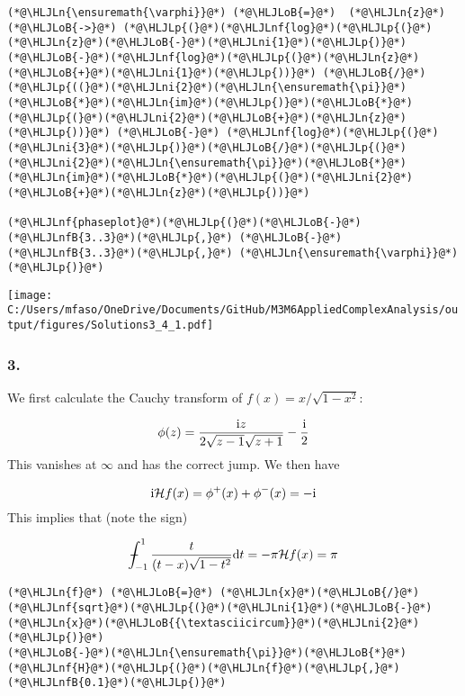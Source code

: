 \documentclass[12pt,landscape]{article}
\newcommand{\HLJLn}[1]{#1}
\newcommand{\HLJLnf}[1]{\textcolor[RGB]{66,102,213}{#1}}
\newcommand{\HLJLnfB}[1]{\textcolor[RGB]{59,151,46}{#1}}
\newcommand{\HLJLni}[1]{\textcolor[RGB]{59,151,46}{#1}}
\newcommand{\HLJLoB}[1]{\textcolor[RGB]{102,102,102}{\textbf{#1}}}
\newcommand{\HLJLp}[1]{#1}
\def\D{ {\rm d} }
\def\I{ {\rm i} }
\def\HH{ {\cal H} }
\def\Xint#1{ \mathchoice
   {\XXint\displaystyle\textstyle{#1} }%
   {\XXint\textstyle\scriptstyle{#1} }%
   {\XXint\scriptstyle\scriptscriptstyle{#1} }%
   {\XXint\scriptscriptstyle\scriptscriptstyle{#1} }%
   \!\int}
\def\XXint#1#2#3{ {\setbox0=\hbox{$#1{#2#3}{\int}$}
     \vcenter{\hbox{$#2#3$}}\kern-.5\wd0} }
\def\dashint{\Xint-}
\def\dt{\D t}
\begin{document}
{\begin{lstlisting}
(*@\HLJLn{\ensuremath{\varphi}}@*) (*@\HLJLoB{=}@*)  (*@\HLJLn{z}@*) (*@\HLJLoB{->}@*) (*@\HLJLp{(}@*)(*@\HLJLnf{log}@*)(*@\HLJLp{(}@*)(*@\HLJLn{z}@*)(*@\HLJLoB{-}@*)(*@\HLJLni{1}@*)(*@\HLJLp{)}@*)(*@\HLJLoB{-}@*)(*@\HLJLnf{log}@*)(*@\HLJLp{(}@*)(*@\HLJLn{z}@*)(*@\HLJLoB{+}@*)(*@\HLJLni{1}@*)(*@\HLJLp{))}@*) (*@\HLJLoB{/}@*) (*@\HLJLp{((}@*)(*@\HLJLni{2}@*)(*@\HLJLn{\ensuremath{\pi}}@*)(*@\HLJLoB{*}@*)(*@\HLJLn{im}@*)(*@\HLJLp{)}@*)(*@\HLJLoB{*}@*)(*@\HLJLp{(}@*)(*@\HLJLni{2}@*)(*@\HLJLoB{+}@*)(*@\HLJLn{z}@*)(*@\HLJLp{))}@*) (*@\HLJLoB{-}@*) (*@\HLJLnf{log}@*)(*@\HLJLp{(}@*)(*@\HLJLni{3}@*)(*@\HLJLp{)}@*)(*@\HLJLoB{/}@*)(*@\HLJLp{(}@*)(*@\HLJLni{2}@*)(*@\HLJLn{\ensuremath{\pi}}@*)(*@\HLJLoB{*}@*)(*@\HLJLn{im}@*)(*@\HLJLoB{*}@*)(*@\HLJLp{(}@*)(*@\HLJLni{2}@*)(*@\HLJLoB{+}@*)(*@\HLJLn{z}@*)(*@\HLJLp{))}@*)

(*@\HLJLnf{phaseplot}@*)(*@\HLJLp{(}@*)(*@\HLJLoB{-}@*)(*@\HLJLnfB{3..3}@*)(*@\HLJLp{,}@*) (*@\HLJLoB{-}@*)(*@\HLJLnfB{3..3}@*)(*@\HLJLp{,}@*) (*@\HLJLn{\ensuremath{\varphi}}@*)(*@\HLJLp{)}@*)
\end{lstlisting}

\texttt{[image: C:/Users/mfaso/OneDrive/Documents/GitHub/M3M6AppliedComplexAnalysis/output/figures/Solutions3\_4\_1.pdf]}

\subsubsection{3.}
We first calculate the Cauchy transform of $f(x) = x/\sqrt{1-x^2}$:

\[
\phi(z) = {\I z  \over 2 \sqrt{z -1} \sqrt{z+1}} - {\I \over 2}
\]
This vanishes at $\infty$ and has the correct jump. We then have

\[
\I{\cal H}f(x) = \phi^+(x) + \phi^-(x) = -\I
\]
This implies that (note the sign)

\[
\dashint_{-1}^1 {t \over (t-x) \sqrt{1-t^2}} \dt = -\pi \HH f(x) = \pi
\]

\begin{lstlisting}
(*@\HLJLn{f}@*) (*@\HLJLoB{=}@*) (*@\HLJLn{x}@*)(*@\HLJLoB{/}@*)(*@\HLJLnf{sqrt}@*)(*@\HLJLp{(}@*)(*@\HLJLni{1}@*)(*@\HLJLoB{-}@*)(*@\HLJLn{x}@*)(*@\HLJLoB{{\textasciicircum}}@*)(*@\HLJLni{2}@*)(*@\HLJLp{)}@*)
(*@\HLJLoB{-}@*)(*@\HLJLn{\ensuremath{\pi}}@*)(*@\HLJLoB{*}@*)(*@\HLJLnf{H}@*)(*@\HLJLp{(}@*)(*@\HLJLn{f}@*)(*@\HLJLp{,}@*) (*@\HLJLnfB{0.1}@*)(*@\HLJLp{)}@*)
\end{lstlisting}

}
\end{document}
